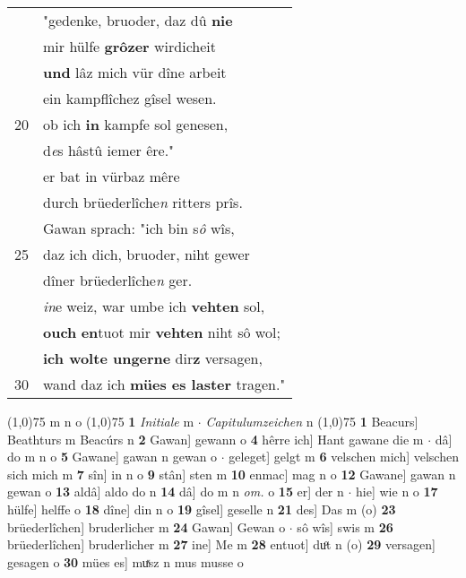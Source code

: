 \documentclass[8pt,a4paper,notitlepage]{article}
\begin{document}
\begin{table}[ht]
\begin{minipage}[t]{0.5\linewidth}
\begin{tabular}{rl}
 & "gedenke, bruoder, daz dû \textbf{nie}\\ 
 & mir hülfe \textbf{grôzer} wirdicheit\\ 
 & \textbf{und} lâz mich vür dîne arbeit\\ 
 & ein kampflîchez gîsel wesen.\\ 
20 & ob ich \textbf{in} kampfe sol genesen,\\ 
 & d\textit{e}s hâstû iemer êre."\\ 
 & er bat in vürbaz mêre\\ 
 & durch brüederlîche\textit{n} ritters prîs.\\ 
 & Gawan sprach: "ich bin s\textit{ô} wîs,\\ 
25 & daz ich dich, bruoder, niht gewer\\ 
 & dîner brüederlîche\textit{n} ger.\\ 
 & \textit{in}e weiz, war umbe ich \textbf{vehten} sol,\\ 
 & \textbf{ouch} \textbf{en}tuot mir \textbf{vehten} niht sô wol;\\ 
 & \textbf{ich wolte ungerne} dir\textbf{z} versagen,\\ 
30 & wand daz ich \textbf{mües es laster} tragen."\\ 
\end{tabular}
\scriptsize
\line(1,0){75} \newline
m n o \newline
\line(1,0){75} \newline
\textbf{1} \textit{Initiale} m   $\cdot$ \textit{Capitulumzeichen} n  \newline
\line(1,0){75} \newline
\textbf{1} Beacurs] Beathturs m Beacúrs n \textbf{2} Gawan] gewann o \textbf{4} hêrre ich] Hant gawane die m  $\cdot$ dâ] do m n o \textbf{5} Gawane] gawan n gewan o  $\cdot$ geleget] gelgt m \textbf{6} velschen mich] velschen sich mich m \textbf{7} sîn] in n o \textbf{9} stân] sten m \textbf{10} enmac] mag n o \textbf{12} Gawane] gawan n gewan o \textbf{13} aldâ] aldo do n \textbf{14} dâ] do m n \textit{om.} o \textbf{15} er] der n  $\cdot$ hie] wie n o \textbf{17} hülfe] helffe o \textbf{18} dîne] din n o \textbf{19} gîsel] geselle n \textbf{21} des] Das m (o) \textbf{23} brüederlîchen] bruderlicher m \textbf{24} Gawan] Gewan o  $\cdot$ sô wîs] swis m \textbf{26} brüederlîchen] bruderlicher m \textbf{27} ine] Me m \textbf{28} entuot] duͦt n (o) \textbf{29} versagen] gesagen o \textbf{30} mües es] muͯsz n mus musse o \newline
\end{minipage}
\end{table}
\end{document}
